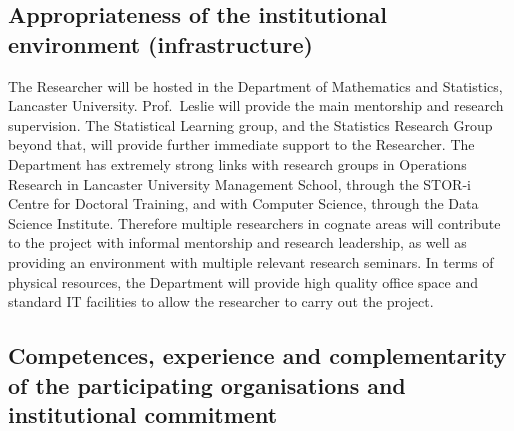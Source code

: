 \documentclass[a4paper,11pt]{article}
\begin{document}
\subsection{Appropriateness of the institutional environment (infrastructure)}
\label{sec:institution}


The Researcher will be hosted in the Department of Mathematics and Statistics, Lancaster University.  Prof.\ Leslie will provide the main mentorship and research supervision.  The Statistical Learning group, and the Statistics Research Group beyond that, will provide further immediate support to the Researcher.  The Department has extremely strong links with research groups in Operations Research in Lancaster University Management School, through the STOR-i Centre for Doctoral Training, and with Computer Science, through the Data Science Institute.  Therefore multiple researchers in cognate areas will contribute to the project with informal mentorship and research leadership, as well as providing an environment with multiple relevant research seminars.  In terms of physical resources, the Department will provide high quality office space and standard IT facilities to allow the researcher to carry out the project.


\subsection{Competences, experience and complementarity of the participating organisations and institutional commitment}
\label{sec:competences}


\end{document}
